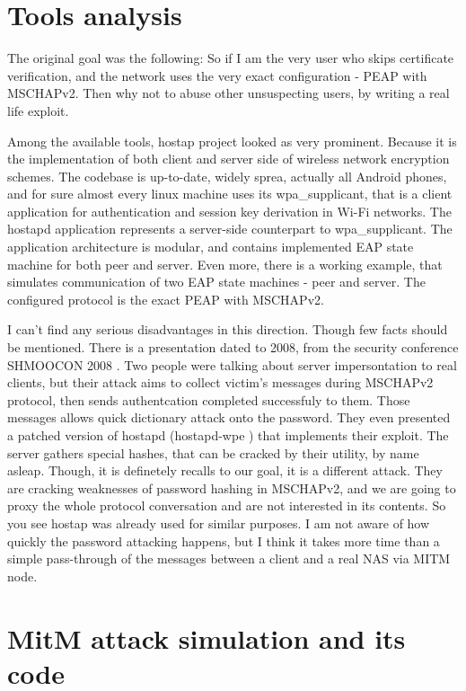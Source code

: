 \documentclass{amsart}
\begin{document}
\section{Tools analysis}

The original goal was the following:
So if I am the very user who skips certificate verification,
and the network uses the very exact configuration - PEAP with MSCHAPv2.
Then why not to abuse other unsuspecting users,
by writing a real life exploit.

Among the available tools,
hostap project \cite{hostap-w1fi} looked as very prominent.
Because it is the implementation of both client and server side
of wireless network encryption schemes.
The codebase is up-to-date, widely sprea,
actually all Android phones, and for sure almost every linux machine
uses its wpa\_supplicant, that is a client application for authentication
and session key derivation in Wi-Fi networks.
The hostapd application represents a server-side counterpart
to wpa\_supplicant.
The application architecture is modular, and contains implemented EAP state machine
for both peer and server.
Even more, there is a working example, that simulates communication
of two EAP state machines - peer and server. The configured protocol
is the exact PEAP with MSCHAPv2.

I can't find any serious disadvantages in this direction.
Though few facts should be mentioned.
There is a presentation dated to 2008,
from the security conference SHMOOCON 2008 \cite{whfs-peap-shmoocon-2008}.
Two people were talking about server impersontation
to real clients,
but their attack aims to collect
victim's messages during MSCHAPv2 protocol,
then sends authentcation completed successfuly to them.
Those messages allows quick dictionary attack onto the password.
They even presented a patched version of hostapd (hostapd-wpe \cite{hostapd-wpe})
that implements their exploit.
The server gathers special hashes,
that can be cracked by their utility, by name asleap.
Though, it is definetely recalls to our goal,
it is a different attack.
They are cracking weaknesses of password hashing in MSCHAPv2,
and we are going to proxy the whole protocol conversation
and are not interested in its contents.
So you see hostap was already used for similar purposes.
I am not aware of how quickly the password attacking happens,
but I think it takes more time than a simple pass-through of the messages
between a client and a real NAS via MITM node.

\section{MitM attack simulation and its code}
\end{document}
